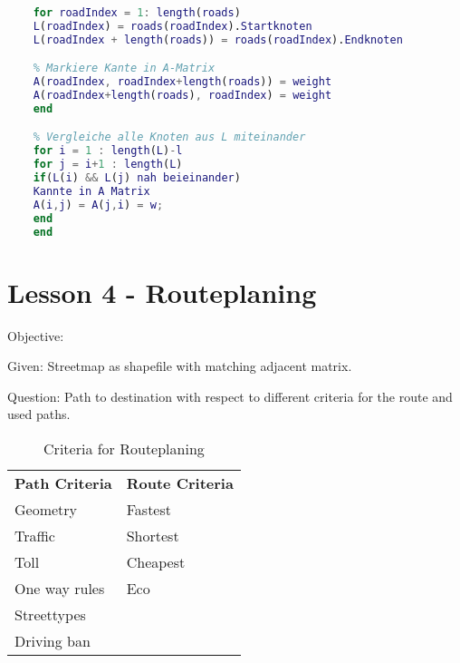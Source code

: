 \begin{lstlisting}[caption=Pseudocode for ajacent creation, language=matlab, label=shaperead]
    % Fuer alle Strassensegmente
    for roadIndex = 1: length(roads)
    L(roadIndex) = roads(roadIndex).Startknoten
    L(roadIndex + length(roads)) = roads(roadIndex).Endknoten

    % Markiere Kante in A-Matrix
    A(roadIndex, roadIndex+length(roads)) = weight
    A(roadIndex+length(roads), roadIndex) = weight
    end

    % Vergleiche alle Knoten aus L miteinander
    for i = 1 : length(L)-l
    for j = i+1 : length(L)
    if(L(i) && L(j) nah beieinander)
    Kannte in A Matrix
    A(i,j) = A(j,i) = w;
    end
    end
\end{lstlisting}


\chapter{Lesson 4 - Routeplaning}

\begin{labeling}{Objective:}
    \item[Given:] Streetmap as shapefile with matching adjacent matrix.
    \item[Question:] Path to destination with respect to different criteria for the route and used paths.
\end{labeling}

\begin{table}[h!]
    \centering
    \begin{tabular}{l l}
        \textbf{Path Criteria} & \textbf{Route Criteria}  \\[0.5em]
        Geometry & Fastest \\
        Traffic & Shortest \\
        Toll & Cheapest \\
        One way rules & Eco \\
        Streettypes & \\
        Driving ban & \\
    \end{tabular}
    \caption{Criteria for Routeplaning}
    \label{tbl:criteriaRouteplaning}
\end{table}


